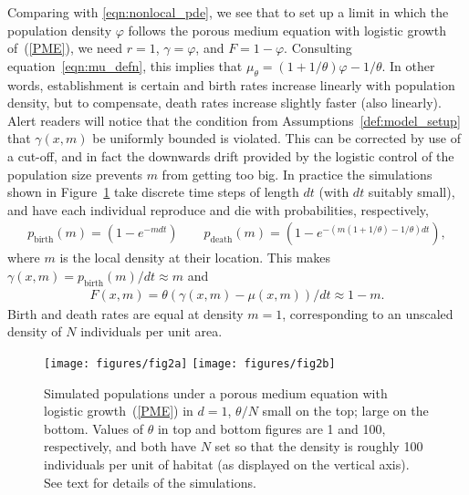 \documentclass[EJP]{ejpecp} %
\begin{document}
Comparing with \eqref{eqn:nonlocal_pde},
we see that to set up a limit in which the population density $\varphi$ follows the 
porous medium equation with logistic growth of~(\ref{PME}),
we need $r=1$,
$\gamma = \varphi$, and $F = 1 - \varphi$.
Consulting equation~\eqref{eqn:mu_defn},
this implies that $\mu_\theta = (1 + 1/\theta) \varphi - 1/\theta$.
In other words,
establishment is certain
and birth rates increase linearly with population density,
but to compensate, death rates increase slightly faster (also linearly).
Alert readers will notice that
the condition from Assumptions~\ref{def:model_setup} 
that $\gamma(x,m)$ be uniformly bounded 
is violated.
This can be corrected by use of a cut-off, and in fact the downwards drift
provided by the logistic control of the population size prevents $m$ from 
getting too big. 
In practice the simulations shown in Figure~\ref{fig:pme_waves}
take discrete time steps of length $dt$ (with $dt$ suitably small),
and have each individual reproduce and die with probabilities, respectively,
\begin{align*}
    p_\text{birth}(m) = \left(1 - e^{- m dt}\right)
    \qquad 
    p_\text{death}(m) = \left(1 - e^{- (m (1+1/\theta) - 1/\theta) dt} \right) ,
\end{align*}
where $m$ is the local density at their location.
This makes $\gamma(x, m) = p_\text{birth}(m)/dt \approx m$
and
\begin{align*}
    F(x, m) = \theta(\gamma(x, m) - \mu(x, m)) / dt \approx 1 - m .
\end{align*}
Birth and death rates are equal at density $m = 1$,
corresponding to an unscaled density of $N$ individuals per unit area.

\begin{figure}
    \begin{center}
        \texttt{[image: figures/fig2a]}
        \texttt{[image: figures/fig2b]}
    \end{center}
    \caption{
        Simulated populations under a porous medium equation with logistic growth~(\ref{PME}) in $d=1$,
        $\theta/N$ small on the top; large on the bottom.
        Values of $\theta$ in top and bottom figures
        are 1 and 100, respectively, and both have $N$ set
        so that the density is roughly 100 individuals per unit of habitat
        (as displayed on the vertical axis).
        See text for details of the simulations.
        \label{fig:pme_waves}
    }
\end{figure}
\end{document}
